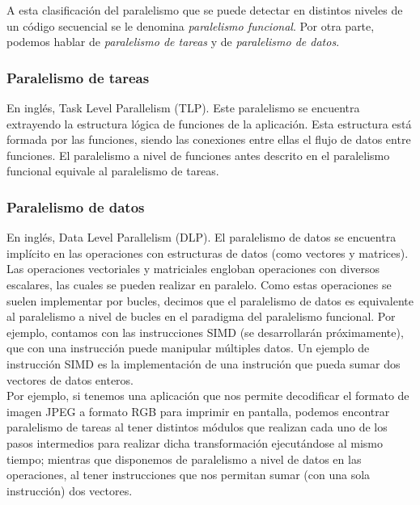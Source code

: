 A esta clasificación del paralelismo que se puede detectar en distintos niveles de un código secuencial se le denomina \emph{paralelismo funcional}. Por otra parte, podemos hablar de \emph{paralelismo de tareas} y de \emph{paralelismo de datos}.

\subsubsection{Paralelismo de tareas}
En inglés, Task Level Parallelism (TLP). Este paralelismo se encuentra extrayendo la estructura lógica de funciones de la aplicación. Esta estructura está formada por las funciones, siendo las conexiones entre ellas el flujo de datos entre funciones. El paralelismo a nivel de funciones antes descrito en el paralelismo funcional equivale al paralelismo de tareas.

\subsubsection{Paralelismo de datos}
En inglés, Data Level Parallelism (DLP). El paralelismo de datos se encuentra implícito en las operaciones con estructuras de datos (como vectores y matrices). Las operaciones vectoriales y matriciales engloban operaciones con diversos escalares, las cuales se pueden realizar en paralelo. Como estas operaciones se suelen implementar por bucles, decimos que el paralelismo de datos es equivalente al paralelismo a nivel de bucles en el paradigma del paralelismo funcional. Por ejemplo, contamos con las instrucciones SIMD (se desarrollarán próximamente), que con una instrucción puede manipular múltiples datos. Un ejemplo de instrucción SIMD es la implementación de una instrución que pueda sumar dos vectores de datos enteros.\\

Por ejemplo, si tenemos una aplicación que nos permite decodificar el formato de imagen JPEG a formato RGB para imprimir en pantalla, podemos encontrar paralelismo de tareas al tener distintos módulos que realizan cada uno de los pasos intermedios para realizar dicha transformación ejecutándose al mismo tiempo; mientras que disponemos de paralelismo a nivel de datos en las operaciones, al tener instrucciones que nos permitan sumar (con una sola instrucción) dos vectores.

